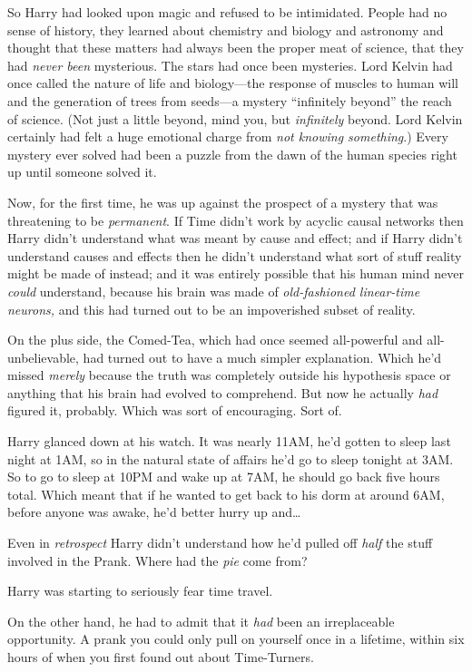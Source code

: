So Harry had looked upon magic and refused to be intimidated. People had
no sense of history, they learned about chemistry and biology and
astronomy and thought that these matters had always been the proper meat
of science, that they had \emph{never been} mysterious. The stars had
once been mysteries. Lord Kelvin had once called the nature of life and
biology---the response of muscles to human will and the generation of
trees from seeds---a mystery ``infinitely beyond'' the reach of science.
(Not just a little beyond, mind you, but \emph{infinitely} beyond. Lord
Kelvin certainly had felt a huge emotional charge from \emph{not knowing
something}.) Every mystery ever solved had been a puzzle from the dawn
of the human species right up until someone solved it.

Now, for the first time, he was up against the prospect of a mystery
that was threatening to be \emph{permanent}. If Time didn't work by
acyclic causal networks then Harry didn't understand what was meant by
cause and effect; and if Harry didn't understand causes and effects then
he didn't understand what sort of stuff reality might be made of
instead; and it was entirely possible that his human mind never
\emph{could} understand, because his brain was made of
\emph{old-fashioned linear-time neurons,} and this had turned out to be
an impoverished subset of reality.

On the plus side, the Comed-Tea, which had once seemed all-powerful and
all-unbelievable, had turned out to have a much simpler explanation.
Which he'd missed \emph{merely} because the truth was completely outside
his hypothesis space or anything that his brain had evolved to
comprehend. But now he actually \emph{had} figured it, probably. Which
was sort of encouraging. Sort of.

Harry glanced down at his watch. It was nearly 11AM, he'd gotten to
sleep last night at 1AM, so in the natural state of affairs he'd go to
sleep tonight at 3AM. So to go to sleep at 10PM and wake up at 7AM, he
should go back five hours total. Which meant that if he wanted to get
back to his dorm at around 6AM, before anyone was awake, he'd better
hurry up and\ldots{}

Even in \emph{retrospect} Harry didn't understand how he'd pulled off
\emph{half} the stuff involved in the Prank. Where had the \emph{pie}
come from?

Harry was starting to seriously fear time travel.

On the other hand, he had to admit that it \emph{had} been an
irreplaceable opportunity. A prank you could only pull on yourself once
in a lifetime, within six hours of when you first found out about
Time-Turners.

